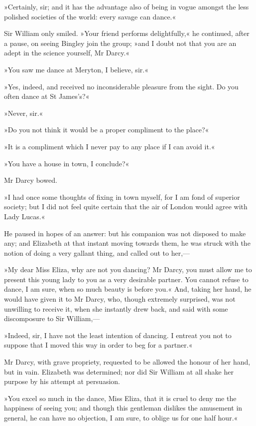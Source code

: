 »Certainly, sir; and it has the advantage also of being in vogue amongst the less polished societies of the world: every savage can dance.«

Sir William only smiled. »Your friend performs delightfully,« he continued, after a pause, on seeing Bingley join the group; »and I doubt not that you are an adept in the science yourself, Mr Darcy.«

»You saw me dance at Meryton, I believe, sir.«

»Yes, indeed, and received no inconsiderable pleasure from the sight. Do you often dance at St James's?«

»Never, sir.«

»Do you not think it would be a proper compliment to the place?«

»It is a compliment which I never pay to any place if I can avoid it.«

»You have a house in town, I conclude?«

Mr Darcy bowed.

»I had once some thoughts of fixing in town myself, for I am fond of superior society; but I did not feel quite certain that the air of London would agree with Lady Lucas.«

He paused in hopes of an answer: but his companion was not disposed to make any; and Elizabeth at that instant moving towards them, he was struck with the notion of doing a very gallant thing, and called out to her,—

»My dear Miss Eliza, why are not you dancing? Mr Darcy, you must allow me to present this young lady to you as a very desirable partner. You cannot refuse to dance, I am sure, when so much beauty is before you.« And, taking her hand, he would have given it to Mr Darcy, who, though extremely surprised, was not unwilling to receive it, when she instantly drew back, and said with some discomposure to Sir William,—

»Indeed, sir, I have not the least intention of dancing. I entreat you not to suppose that I moved this way in order to beg for a partner.«

Mr Darcy, with grave propriety, requested to be allowed the honour of her hand, but in vain. Elizabeth was determined; nor did Sir William at all shake her purpose by his attempt at persuasion.

»You excel so much in the dance, Miss Eliza, that it is cruel to deny me the happiness of seeing you; and though this gentleman dislikes the amusement in general, he can have no objection, I am sure, to oblige us for one half hour.«

